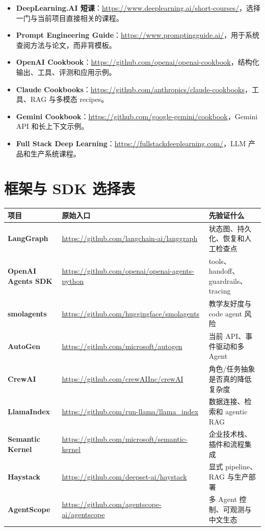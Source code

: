 \begin{itemize}
  \item \textbf{DeepLearning.AI 短课}：\url{https://www.deeplearning.ai/short-courses/}，选择一门与当前项目直接相关的课程。
  \item \textbf{Prompt Engineering Guide}：\url{https://www.promptingguide.ai/}，用于系统查阅方法与论文，而非背模板。
  \item \textbf{OpenAI Cookbook}：\url{https://github.com/openai/openai-cookbook}，结构化输出、工具、评测和应用示例。
  \item \textbf{Claude Cookbooks}：\url{https://github.com/anthropics/claude-cookbooks}，工具、RAG 与多模态 recipes。
  \item \textbf{Gemini Cookbook}：\url{https://github.com/google-gemini/cookbook}，Gemini API 和长上下文示例。
  \item \textbf{Full Stack Deep Learning}：\url{https://fullstackdeeplearning.com/}，LLM 产品和生产系统课程。
\end{itemize}

\section{框架与 SDK 选择表}

\begin{longtable}{>{\bfseries}p{} p{} p{}}
\toprule
项目 & 原始入口 & 先验证什么 \\
\midrule
LangGraph & \url{https://github.com/langchain-ai/langgraph} & 状态图、持久化、恢复和人工检查点 \\
OpenAI Agents SDK & \url{https://github.com/openai/openai-agents-python} & tools、handoff、guardrails、tracing \\
smolagents & \url{https://github.com/huggingface/smolagents} & 教学友好度与 code agent 风险 \\
AutoGen & \url{https://github.com/microsoft/autogen} & 当前 API、事件驱动和多 Agent \\
CrewAI & \url{https://github.com/crewAIInc/crewAI} & 角色/任务抽象是否真的降低复杂度 \\
LlamaIndex & \url{https://github.com/run-llama/llama_index} & 数据连接、检索和 agentic RAG \\
Semantic Kernel & \url{https://github.com/microsoft/semantic-kernel} & 企业技术栈、插件和流程集成 \\
Haystack & \url{https://github.com/deepset-ai/haystack} & 显式 pipeline、RAG 与生产部署 \\
AgentScope & \url{https://github.com/agentscope-ai/agentscope} & 多 Agent 控制、可观测与中文生态 \\
\bottomrule
\end{longtable}

